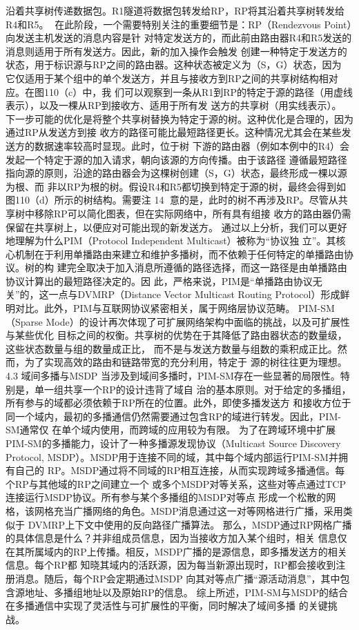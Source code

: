  沿着共享树传递数据包。R1隧道将数据包转发给RP，RP将其沿着共享树转发给R4和R5。
在此阶段，一个需要特别关注的重要细节是：RP（Rendezvous Point）向发送主机发送的消息内容是针
对特定发送方的，而此前由路由器R4和R5发送的消息则适用于所有发送方。因此，新的加入操作会触发
创建一种特定于发送方的状态，用于标识源与RP之间的路由器。这种状态被定义为（S，G）状态，因为
它仅适用于某个组中的单个发送方，并且与接收方到RP之间的共享树结构相对应。在图110（c）中，我
们可以观察到一条从R1到RP的特定于源的路径（用虚线表示），以及一棵从RP到接收方、适用于所有发
送方的共享树（用实线表示）。
下一步可能的优化是将整个共享树替换为特定于源的树。这种优化是合理的，因为通过RP从发送方到接
收方的路径可能比最短路径更长。这种情况尤其会在某些发送方的数据速率较高时显现。此时，位于树
下游的路由器（例如本例中的R4）会发起一个特定于源的加入请求，朝向该源的方向传播。由于该路径
遵循最短路径指向源的原则，沿途的路由器会为这棵树创建（S，G）状态，最终形成一棵以源为根、而
非以RP为根的树。假设R4和R5都切换到特定于源的树，最终会得到如图110（d）所示的树结构。需要注
                                                    14
意的是，此时的树不再涉及RP。尽管从共享树中移除RP可以简化图表，但在实际网络中，所有具有组接
收方的路由器仍需保留在共享树上，以便应对可能出现的新发送方。
通过以上分析，我们可以更好地理解为什么PIM（Protocol Independent Multicast）被称为“协议独
立”。其核心机制在于利用单播路由来建立和维护多播树，而不依赖于任何特定的单播路由协议。树的构
建完全取决于加入消息所遵循的路径选择，而这一路径是由单播路由协议计算出的最短路径决定的。因
此，严格来说，PIM是“单播路由协议无关”的，这一点与DVMRP（Distance Vector Multicast Routing
Protocol）形成鲜明对比。此外，PIM与互联网协议紧密相关，属于网络层协议范畴。
PIM-SM（Sparse Mode）的设计再次体现了可扩展网络架构中面临的挑战，以及可扩展性与某些优化
目标之间的权衡。共享树的优势在于其降低了路由器状态的数量级，这些状态数量与组的数量成正比，
而不是与发送方数量与组数的乘积成正比。然而，为了实现高效的路由和链路带宽的充分利用，特定于
源的树往往更为理想。
4.3 域间多播与MSDP
当涉及到域间多播时，PIM-SM存在一些显著的局限性。特别是，单一组共享一个RP的设计违背了域自
治的基本原则。对于给定的多播组，所有参与的域都必须依赖于RP所在的位置。此外，即使多播发送方
和接收方位于同一个域内，最初的多播通信仍然需要通过包含RP的域进行转发。因此，PIM-SM通常仅
在单个域内使用，而跨域的应用较为有限。
为了在跨域环境中扩展PIM-SM的多播能力，设计了一种多播源发现协议（Multicast Source
Discovery Protocol, MSDP）。MSDP用于连接不同的域，其中每个域内部运行PIM-SM并拥有自己的
RP。MSDP通过将不同域的RP相互连接，从而实现跨域多播通信。每个RP与其他域的RP之间建立一个
或多个MSDP对等关系，这些对等点通过TCP连接运行MSDP协议。所有参与某个多播组的MSDP对等点
形成一个松散的网格，该网格充当广播网络的角色。MSDP消息通过这一对等网格进行广播，采用类似于
DVMRP上下文中使用的反向路径广播算法。
那么，MSDP通过RP网格广播的具体信息是什么？并非组成员信息，因为当接收方加入某个组时，相关
信息仅在其所属域内的RP上传播。相反，MSDP广播的是源信息，即多播发送方的相关信息。每个RP都
知晓其域内的活跃源，因为每当新源出现时，RP都会接收到注册消息。随后，每个RP会定期通过MSDP
向其对等点广播“源活动消息”，其中包含源地址、多播组地址以及原始RP的信息。
综上所述，PIM-SM与MSDP的结合在多播通信中实现了灵活性与可扩展性的平衡，同时解决了域间多播
的关键挑战。




